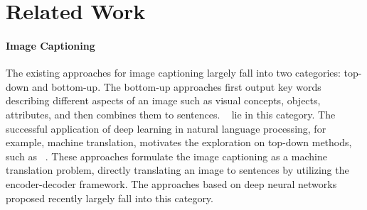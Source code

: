 \documentclass[11pt,a4paper]{article}
\begin{document}






\section{Related Work}
%
\paragraph{Image Captioning} The existing approaches for image captioning largely fall into two categories: top-down and bottom-up. The bottom-up approaches first output key words describing different aspects of an image such as visual concepts, objects, attributes, and then combines them to sentences.
~\cite{farhadi2010every,kulkarni2011baby,elliott2013image,lebret2014simple,fang2015captions} lie in this category. The successful application of deep learning in natural language processing, for example, machine translation, motivates the exploration on top-down methods, such as ~\cite{mao2014deep,donahue2015long,jia2015guiding,vinyals2015show,xu2015show}. These approaches formulate the image captioning as a machine translation problem, directly translating an image to sentences by utilizing the encoder-decoder framework.
The approaches based on deep neural networks proposed recently largely fall into this category. 
\end{document}
